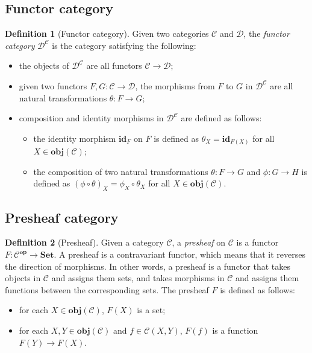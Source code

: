\documentclass[12pt,twoside,a4paper]{report}
\theoremstyle{definition}
\newtheorem*{definition*}{Definition}
\theoremstyle{definition}
\begin{document}
        \subsection{Functor category}
        \begin{definition*}[Functor category]
            Given two categories $\mathcal{C}$ and $\mathcal{D}$, the \emph{functor category} $\mathcal{D}^{\mathcal{C}}$ is the category satisfying the following:
            \begin{itemize}
                \item 
                    the objects of $\mathcal{D}^{\mathcal{C}}$ are all functors $\mathcal{C} \to \mathcal{D}$;
                \item 
                    given two functors $F,G: \mathcal{C} \to \mathcal{D}$, the morphisms from $F$ to $G$ in $\mathcal{D}^{\mathcal{C}}$ are all natural transformations $\theta : F \to G$;
                \item
                    composition and identity morphisms in $\mathcal{D}^{\mathcal{C}}$ are defined as follows:
                    \begin{itemize}
                        \item 
                            the identity morphism $\textbf{id}_F$ on $F$ is defined as $\theta_X = \textbf{id}_{F(X)}$ for all $X \in \textbf{obj}(\mathcal{C})$;
                        \item
                            the composition of two natural transformations $\theta : F \to G$ and $\phi : G \to H$ is defined as $(\phi \circ \theta)_X = \phi_X \circ \theta_X$ for all $X \in \textbf{obj}(\mathcal{C})$.
                    \end{itemize}
            \end{itemize}
        \end{definition*}

        \subsection{Presheaf category}
        \begin{definition*}[Presheaf]
            Given a category $\mathcal{C}$, a \emph{presheaf} on $\mathcal{C}$ is a functor $F: \mathcal{C}^{\textbf{op}} \to \textbf{Set}$.
            A presheaf is a contravariant functor, which means that it reverses the direction of morphisms.
            In other words, a presheaf is a functor that takes objects in $\mathcal{C}$ and assigns them sets, and takes morphisms in $\mathcal{C}$ and assigns them functions between the corresponding sets.
            The presheaf $F$ is defined as follows:
            \begin{itemize}
                \item 
                    for each $X \in \textbf{obj}(\mathcal{C})$, $F(X)$ is a set;
                \item
                    for each $X, Y \in \textbf{obj}(\mathcal{C})$ and $f \in \mathcal{C}{(X,Y)}$, $F(f)$ is a function $F(Y) \to F(X)$.
            \end{itemize}
        \end{definition*}
\end{document}
